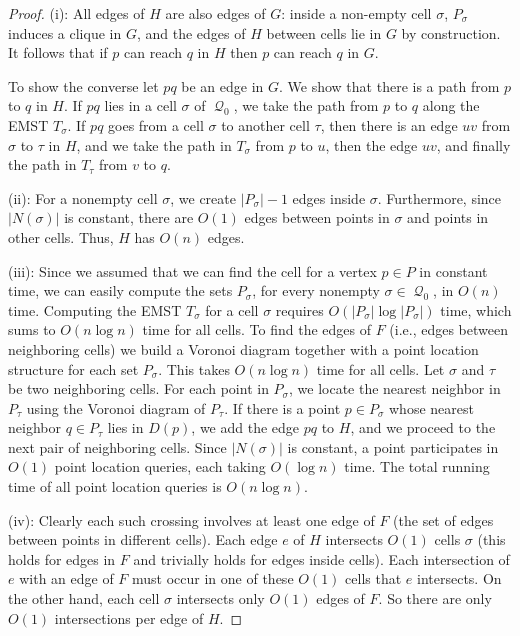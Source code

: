 \documentclass[11pt,a4paper]{paper}
\DeclareMathOperator{\Q}{\mathcal{Q}}
\begin{document}
\begin{proof}
(i): All edges of $H$ are also edges of $G$:
inside a non-empty cell $\sigma$, $P_\sigma$ induces
a clique in $G$, and the edges of $H$ between cells
lie in $G$ by construction. It follows that
if $p$ can reach $q$ in $H$ then $p$ can reach $q$ in $G$.

To show the converse let
$pq$ be an edge in $G$. We show that there
is a path from $p$ to $q$ in $H$.
If $pq$ lies in a cell $\sigma$ of $\Q_0$,
we take the path from $p$ to $q$ along the EMST $T_\sigma$.
If $pq$ goes from a cell $\sigma$ to
another cell $\tau$, then
there is an edge $uv$ from
$\sigma$ to $\tau$ in $H$, and
we take the path in $T_{\sigma}$ from $p$ to $u$,
then the edge $uv$, and finally the path
in $T_{\tau}$ from $v$ to $q$.

(ii): For a nonempty cell $\sigma$,
we create $|P_\sigma|-1$ edges inside $\sigma$. Furthermore,
since $|N(\sigma)|$ is constant,
there are  $O(1)$ edges between points in  $\sigma$ and points in other cells.
Thus, $H$ has $O(n)$ edges.

(iii): Since we assumed that we can find the cell for a vertex
$p \in P$ in constant time, we can easily compute the sets
$P_\sigma$, for every nonempty $\sigma \in \Q_0$,  in
$O(n )$ time.
Computing the EMST $T_\sigma$ for a cell $\sigma$ requires
$O(|P_\sigma|\log |P_\sigma|)$ time, which sums to
  $O(n \log n)$ time for all cells.
To find the edges of $F$ (i.e., edges between neighboring cells)
we build a Voronoi diagram together with a point location
structure for each set $P_\sigma$.
This takes $O(n\log n)$  time for all cells.
Let $\sigma$ and $\tau$ be two neighboring cells.
For each point in $P_\sigma$, we locate the nearest neighbor in
$P_{\tau}$ using the Voronoi diagram of $P_{\tau}$.
If there is a point $p \in P_\sigma$ whose nearest neighbor
$q \in P_{\tau}$ lies in $D(p)$, we add the edge $pq$ to $H$, and
we proceed to the next pair of neighboring cells.
Since $|N(\sigma)|$ is constant,
a point participates in $O(1)$ point location queries, each taking
 $O(\log n)$ time. The total running
time of all point location queries is $O(n \log n)$.

(iv):
Clearly each such crossing involves at least one edge of $F$ (the set of edges between points in different cells).
Each edge $e$ of $H$ intersects $O(1)$ cells $\sigma$ (this holds for edges in $F$ and trivially holds for edges inside cells). Each intersection of $e$ with an edge of $F$ must occur in one of these $O(1)$ cells that $e$ intersects.
On the other hand, each cell $\sigma$ intersects only $O(1)$ edges of $F$. So there are only $O(1)$ intersections per edge of $H$.
\end{proof}
\end{document}
